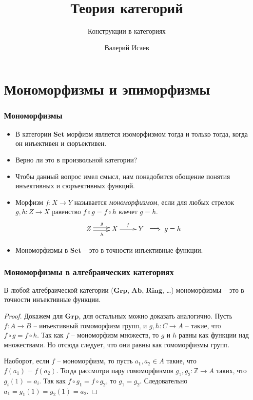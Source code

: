 \documentclass{beamer}
\theoremstyle{definition}
\newcommand{\cat}[1]{\mathbf{#1}}
\newcommand{\Set}{\cat{Set}}
\newcommand{\Grp}{\cat{Grp}}
\newcommand{\Ab}{\cat{Ab}}
\newcommand{\Ring}{\cat{Ring}}
\begin{document}
\title{Теория категорий}
\subtitle{Конструкции в категориях}
\author{Валерий Исаев}
\maketitle

\section{Мономорфизмы и эпиморфизмы}

\begin{frame}
\frametitle{Мономорфизмы}
\begin{itemize}
\item В категории $\Set$ морфизм является изоморфизмом тогда и только тогда, когда он инъективен и сюръективен.
\item Верно ли это в произвольной категории?
\item Чтобы данный вопрос имел смысл, нам понадобится обощение понятия инъективных и сюръективных функций.
\item Морфизм $f : X \to Y$ называется \emph{мономорфизмом}, если для любых стрелок $g, h : Z \to X$ равенство $f \circ g = f \circ h$ влечет $g = h$.
\[ \xymatrix{ Z \ar@<-.5ex>[r]_h \ar@<.5ex>[r]^g & X \ar[r]^f & Y } \implies g = h \]
\item Мономорфизмы в $\Set$ -- это в точности инъективные функции.
\end{itemize}
\end{frame}

\begin{frame}
\frametitle{Мономорфизмы в алгебраических категориях}
\begin{prop}
В любой алгебраической категории ($\Grp$, $\Ab$, $\Ring$, \ldots) мономорфизмы -- это в точности инъективные функции.
\end{prop}
\begin{proof}
Докажем для $\Grp$, для остальных можно доказать аналогично.
Пусть $f : A \to B$ -- инъективный гомоморфизм групп, и $g,h : C \to A$ -- такие, что $f \circ g = f \circ h$.
Так как $f$ -- мономорфизм множеств, то $g$ и $h$ равны как функции над множествами.
Но отсюда следует, что они равны как гомоморфизмы групп.

Наоборот, если $f$ -- мономорфизм, то пусть $a_1, a_2 \in A$ такие, что $f(a_1) = f(a_2)$.
Тогда рассмотри пару гомоморфизмов $g_1, g_2 : \mathbb{Z} \to A$ таких, что $g_i(1) = a_i$.
Так как $f \circ g_1 = f \circ g_2$, то $g_1 = g_2$.
Следовательно $a_1 = g_1(1) = g_2(1) = a_2$.
\end{proof}
\end{frame}
\end{document}
